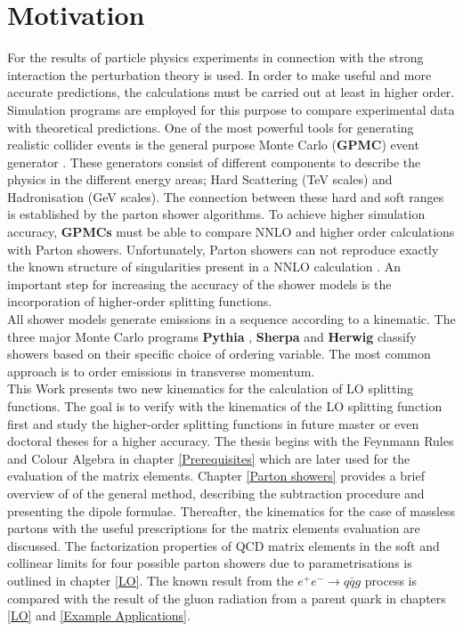 \section*{Motivation}
For the results of particle physics experiments in connection with the strong interaction the perturbation theory is used. In order to make useful and more accurate predictions, the calculations must be carried out at least in higher order.\\ Simulation programs are employed for this purpose to compare experimental data with theoretical predictions. One of the most powerful tools for generating realistic collider events is the general purpose Monte Carlo (\textbf{GPMC}) event generator \cite{Buckley:2011ms}. These generators consist of different components to describe the physics in the different energy areas; Hard Scattering (TeV scales) and Hadronisation (GeV scales). The connection between these hard and soft ranges is established by the parton shower algorithms. To achieve higher simulation accuracy, \textbf{GPMCs} must be able to compare NNLO and higher order calculations with Parton showers. Unfortunately, Parton showers can not reproduce exactly the known structure of singularities present in a NNLO calculation \cite{Dasgupta:2018nvj}.
An important step for increasing the accuracy of the shower models is the incorporation of higher-order splitting functions. \\
All shower models generate emissions in a sequence according to a kinematic. The three major Monte Carlo programs \textbf{Pythia} \cite{Sjostrand:2006za} \cite{Sjostrand:2014zea}, \textbf{Sherpa} \cite{Gleisberg:2008ta} and \textbf{Herwig} \cite{Platzer:2009jq} \cite{Bellm:2015jjp} classify showers based on their specific choice of ordering variable.  The most common approach is to order emissions in transverse momentum.\\
 This Work presents two new kinematics for the calculation of LO splitting functions. The goal is to verify with the kinematics of the LO splitting function first and study the higher-order splitting functions in future master or even doctoral theses for a higher accuracy. The thesis begins with the Feynmann Rules and Colour Algebra in chapter \ref{Prerequisites} which are later used for the evaluation of the matrix elements.
Chapter \ref{Parton showers} provides a brief overview of of the general method, describing the subtraction procedure and presenting the dipole formulae. Thereafter, the kinematics for the case of massless  partons with the useful prescriptions for the matrix elements evaluation are discussed. The factorization properties of QCD matrix elements in the soft and collinear limits for four possible parton showers due to parametrisations is outlined in chapter \ref{LO}. The known result from the $ e^{+}e^{-} \rightarrow q \bar{q} g $ process is compared with the result of the gluon radiation from a parent quark in chapters \ref{LO} and \ref{Example Applications}. \\
